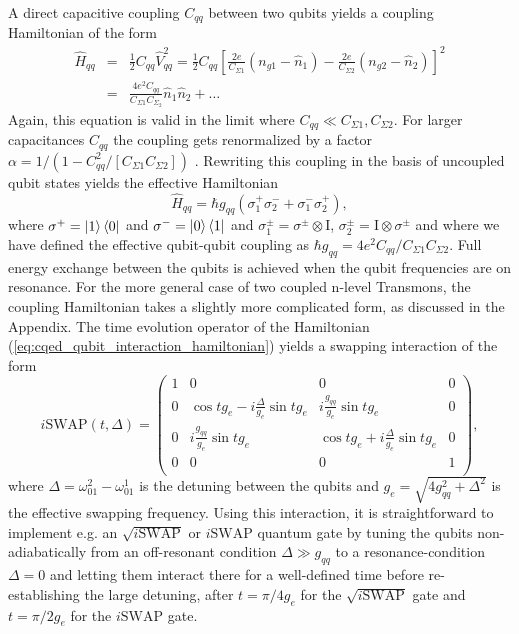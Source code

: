 A direct capacitive coupling $C_{qq}$ between two qubits yields a coupling Hamiltonian of the form
%
\begin{eqnarray}
\hat{H}_{qq} & = & \frac{1}{2}C_{qq}\hat{V}_{qq}^2 = \frac{1}{2}C_{qq}\left[\frac{2e}{C_{\Sigma 1}}(n_{g1}-\hat{n}_1)-\frac{2e}{C_{\Sigma 2}}(n_{g2}-\hat{n}_2)\right]^2 \\
& = & \frac{4e^2 C_{qq}}{C_{\Sigma 1}C_{\Sigma_2}}\hat{n}_1\hat{n}_2+\hdots \label{eq:cqed_capacitive_coupling}
\end{eqnarray}
%
Again, this equation is valid in the limit where $C_{qq} \ll C_{\Sigma 1},C_{\Sigma 2}$. For larger capacitances $C_{qq}$ the coupling gets renormalized by a factor $\alpha = 1/(1-C_{qq}^2/[C_{\Sigma 1}C_{\Sigma 2}])$ \citep{nguyen_cooper_2008}. Rewriting this coupling in the basis of uncoupled qubit states yields the effective Hamiltonian
%
\begin{equation}
\hat{H}_{qq} = \hbar g_{qq}\left(\sigma^+_1\sigma^-_2+\sigma^-_1\sigma^+_2\right), \label{eq:cqed_qubit_interaction_hamiltonian}
\end{equation}
%
where $\sigma^+=\left| 1 \right>\left< 0 \right|$ and $\sigma^-=\left| 0 \right>\left< 1 \right|$ and $\sigma_1^\pm=\sigma^\pm\otimes \mathrm{I}$, $\sigma_2^\pm = \mathrm{I}\otimes \sigma^\pm$ and where we have defined the effective qubit-qubit coupling as $\hbar g_{qq} = 4e^2 C_{qq}/C_{\Sigma 1}C_{\Sigma 2}$. Full energy exchange between the qubits is achieved when the qubit frequencies are on resonance. For the more general case of two coupled n-level Transmons, the coupling Hamiltonian takes a slightly more complicated form, as discussed in the Appendix. The time evolution operator of the Hamiltonian (\ref{eq:cqed_qubit_interaction_hamiltonian}) yields a swapping interaction of the form
%
\begin{equation}
i\mathrm{SWAP}(t,\Delta) = \left(
			\begin{array}{cccc}
				1 & 0 & 0 & 0 \\
				0 & \cos{t g_{e}}-i\frac{\Delta}{g_e}\sin{t g_{e}} & i \frac{g_{qq}}{g_e}\sin{t g_{e}} & 0 \\
				0 & i\frac{g_{qq}}{g_e}\sin{t g_{e}} & \cos{t g_{e}}+i\frac{\Delta}{g_{e}}\sin{t g_{e}} & 0 \\
				0 & 0 & 0 & 1 \\
			\end{array}
	\right), \label{eq:swap_with_detuning}
\end{equation}
%
where $\Delta = \omega_{01}^2-\omega_{01}^1$ is the detuning between the qubits and $g_e = \sqrt{4g_{qq}^2+\Delta^2}$ is the effective swapping frequency. Using this interaction, it is straightforward to implement e.g. an $\sqrt{i\mathrm{SWAP}}$ or $i\mathrm{SWAP}$ quantum gate by tuning the qubits non-adiabatically from an off-resonant condition $\Delta \gg g_{qq}$ to a resonance-condition $\Delta = 0$ and letting them interact there for a well-defined time before re-establishing the large detuning, after $t=\pi/4g_e$ for the $\sqrt{i\mathrm{SWAP}}$ gate and $t=\pi/2g_e$ for the $i\mathrm{SWAP}$ gate.

